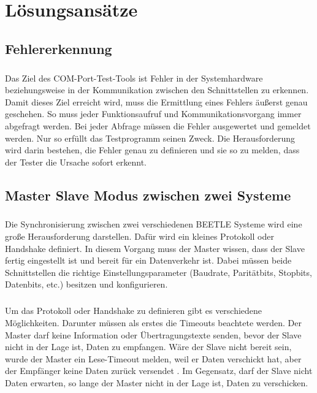 \chapter{Lösungsansätze}\label{chp:loesungsansaetze}

\section{Fehlererkennung}
\paragraph{}
Das Ziel des COM-Port-Test-Tools ist Fehler in der Systemhardware beziehungsweise in der Kommunikation zwischen den Schnittstellen zu erkennen. Damit dieses Ziel erreicht wird, muss die Ermittlung eines Fehlers äußerst genau geschehen. So muss jeder Funktionsaufruf und Kommunikationsvorgang immer abgefragt werden. Bei jeder Abfrage müssen die Fehler ausgewertet und gemeldet werden. Nur so erfüllt das Testprogramm seinen Zweck. Die Herausforderung wird darin bestehen, die Fehler genau zu definieren und sie so zu melden, dass der Tester die Ursache sofort erkennt.

\section{Master Slave Modus zwischen zwei Systeme}
\paragraph{}
Die Synchronisierung zwischen zwei verschiedenen BEETLE Systeme wird eine große Herausforderung darstellen. Dafür wird ein kleines Protokoll oder Handshake definiert. In diesem Vorgang muss der Master wissen, dass der Slave fertig eingestellt ist und bereit für ein Datenverkehr ist. Dabei müssen beide Schnittstellen die richtige Einstellungsparameter (Baudrate, Paritätbits, Stopbits, Datenbits, etc.) besitzen und konfigurieren.

\paragraph{}
Um das Protokoll oder Handshake zu definieren gibt es verschiedene Möglichkeiten. Darunter müssen als erstes die Timeouts beachtete werden. Der Master darf keine Information oder Übertragungstexte senden, bevor der Slave nicht in der Lage ist, Daten zu empfangen. Wäre der Slave nicht bereit sein, wurde der Master ein Lese-Timeout melden, weil er Daten verschickt hat, aber der Empfänger keine Daten zurück versendet . Im Gegensatz, darf der Slave nicht Daten erwarten, so lange der Master nicht in der Lage ist, Daten zu verschicken.

